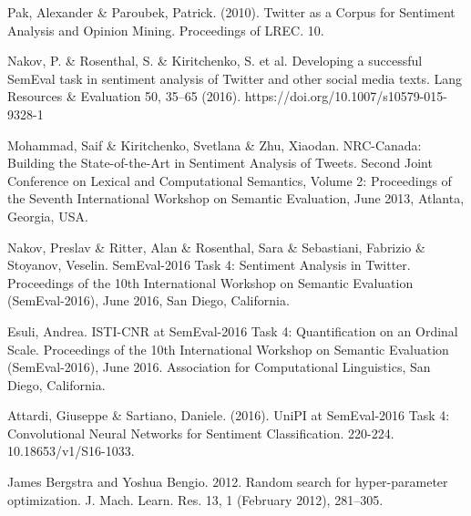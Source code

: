\documentclass[11pt,twocolumn]{article}
\begin{document}
    \begin{thebibliography}{7}
        Pak, Alexander \& Paroubek, Patrick. (2010). Twitter as a Corpus for Sentiment Analysis and Opinion
        Mining. Proceedings of LREC. 10.

        Nakov, P. \& Rosenthal, S. \& Kiritchenko, S. et al. Developing a successful SemEval task in sentiment
        analysis of Twitter and other social media texts. Lang Resources \& Evaluation 50, 35–65 (2016).
        https://doi.org/10.1007/s10579-015-9328-1

        Mohammad, Saif \& Kiritchenko, Svetlana \& Zhu, Xiaodan. NRC-Canada: Building the State-of-the-Art in
        Sentiment Analysis of Tweets. Second Joint Conference on Lexical and Computational Semantics,
        Volume 2: Proceedings of the Seventh International Workshop on Semantic Evaluation,
        June 2013, Atlanta, Georgia, USA.

        Nakov, Preslav \& Ritter, Alan \& Rosenthal, Sara \& Sebastiani, Fabrizio \& Stoyanov, Veselin.
        SemEval-2016 Task 4: Sentiment Analysis in Twitter. Proceedings of the 10th International Workshop on
        Semantic Evaluation (SemEval-2016), June 2016, San Diego, California.

        Esuli, Andrea. ISTI-CNR at SemEval-2016 Task 4: Quantification on an Ordinal Scale. Proceedings of the
        10th International Workshop on Semantic Evaluation (SemEval-2016), June 2016. Association for
        Computational Linguistics, San Diego, California.

        Attardi, Giuseppe \& Sartiano, Daniele. (2016). UniPI at SemEval-2016 Task 4: Convolutional Neural
        Networks for Sentiment Classification. 220-224. 10.18653/v1/S16-1033.

        James Bergstra and Yoshua Bengio. 2012. Random search for hyper-parameter optimization. J. Mach. Learn.
        Res. 13, 1 (February 2012), 281–305.

    \end{thebibliography}
\end{document}
